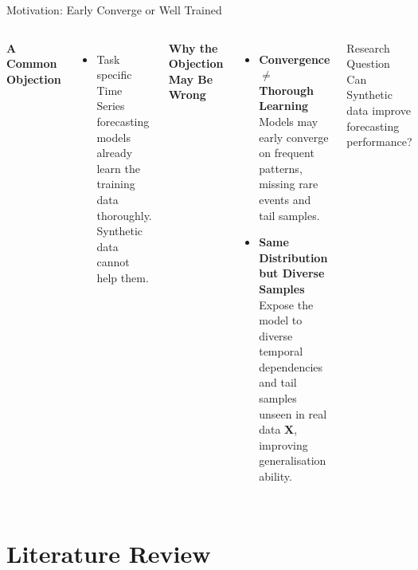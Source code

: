 \documentclass[aspectratio=169,10pt]{beamer}
\begin{document}
\begin{frame}{Motivation: Early Converge or Well Trained}
  \begin{columns}[T]
      \textbf{A Common Objection}
      \begin{itemize}{}
        \item Task specific Time Series forecasting models already learn the training data
        thoroughly. Synthetic data cannot help them.
      \end{itemize}

  \textbf{Why the Objection May Be Wrong}
  \begin{itemize}
    \item \textbf{Convergence $\neq$ Thorough Learning}\\
          Models may early converge on frequent patterns,
          missing rare events and tail samples.
    \item \textbf{Same Distribution but Diverse Samples}
          Expose the model to diverse temporal dependencies
                  and tail samples unseen in real data $\mathbf{X}$, improving generalisation ability.
  \end{itemize}
  \vspace{0.5em}
  \begin{block}{Research Question}
    \centering
    Can Synthetic data improve forecasting performance?
  \end{block}

  \end{columns}
\end{frame}

\section{Literature Review}
% 
\end{document}
